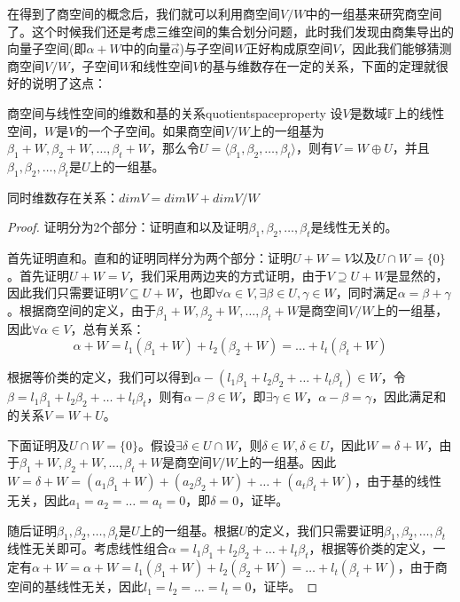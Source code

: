    在得到了商空间的概念后，我们就可以利用商空间$V/W$中的一组基来研究商空间了。这个时候我们还是考虑三维空间的集合划分问题，此时我们发现由商集导出的向量子空间(即$\alpha+W$中的向量$\Vec{\alpha}$)与子空间$W$正好构成原空间$V$，因此我们能够猜测商空间$V/W$，子空间$W$和线性空间$V$的基与维数存在一定的关系，下面的定理就很好的说明了这点：
   \begin{theorem}{商空间与线性空间的维数和基的关系}{quotientspaceproperty}
       设$V$是数域$\mathbb{F}$上的线性空间，$W$是$V$的一个子空间。如果商空间$V/W$上的一组基为$\beta_1+W,\beta_2+W,\dots,\beta_t+W$，那么令$U=\langle\beta_1,\beta_2,\dots,\beta_t\rangle$，则有$V=W\oplus U$，并且$\beta_1,\beta_2,\dots,\beta_t$是$U$上的一组基。
       
       同时维数存在关系：$dimV=dimW+dimV/W$
   \end{theorem}
   \begin{proof}
        证明分为2个部分：证明直和以及证明$\beta_1,\beta_2,\dots,\beta_t$是线性无关的。
        
        首先证明直和。直和的证明同样分为两个部分：证明$U+W=V$以及$U\cap W=\{0\}$。首先证明$U+W=V$，我们采用两边夹的方式证明，由于$V\supseteq U+W$是显然的，因此我们只需要证明$V\subseteq U+W$，也即$\forall \alpha\in V,\exists \beta\in U,\gamma\in W$，同时满足$\alpha=\beta+\gamma$。根据商空间的定义，由于$\beta_1+W,\beta_2+W,\dots,\beta_t+W$是商空间$V/W$上的一组基，因此$\forall \alpha\in V$，总有关系：
        \begin{equation}
            \alpha+W=l_1(\beta_1+W)+l_2(\beta_2+W)=\dots+l_t(\beta_t+W)
        \end{equation}
        
        根据等价类的定义，我们可以得到$\alpha-(l_1\beta_1+l_2\beta_2+\dots+l_t\beta_t)\in W$，令$\beta=l_1\beta_1+l_2\beta_2+\dots+l_t\beta_t$，则有$\alpha-\beta\in W$，即$\exists \gamma\in W$，$\alpha-\beta=\gamma$，因此满足和的关系$V=W+U$。
        
        下面证明及$U\cap W=\{0\}$。假设$\exists \delta\in U\cap W$，则$\delta\in W,\delta\in U$，因此$W=\delta+W$，由于$\beta_1+W,\beta_2+W,\dots,\beta_t+W$是商空间$V/W$上的一组基。因此$W=\delta+W=(a_1\beta_1+W)+(a_2\beta_2+W)+\dots+(a_t\beta_t+W)$，由于基的线性无关，因此$a_1=a_2=\dots=a_t=0$，即$\delta=0$，证毕。
        
        随后证明$\beta_1,\beta_2,\dots,\beta_t$是$U$上的一组基。根据$U$的定义，我们只需要证明$\beta_1,\beta_2,\dots,\beta_t$线性无关即可。考虑线性组合$\alpha=l_1\beta_1+l_2\beta_2+\dots+l_t\beta_t$，根据等价类的定义，一定有$\alpha+W=\alpha+W=l_1(\beta_1+W)+l_2(\beta_2+W)=\dots+l_t(\beta_t+W)$，由于商空间的基线性无关，因此$l_1=l_2=\dots=l_t=0$，证毕。
   \end{proof}
   
